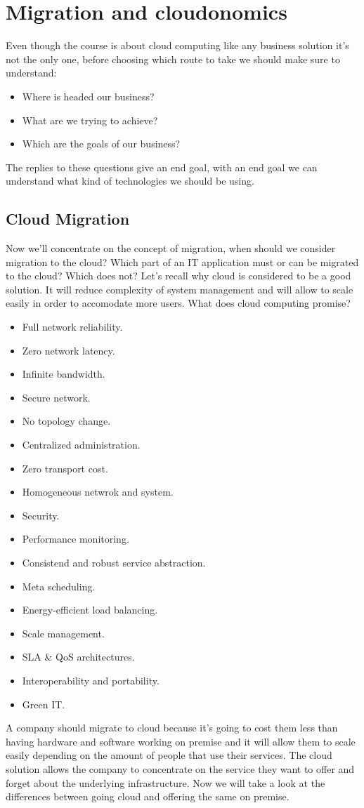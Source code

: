 \section{Migration and cloudonomics}
Even though the course is about cloud computing like any business solution it's not the only one, before choosing which route to take we should make sure to understand:
\begin{itemize}
    \item Where is headed our business?
    \item What are we trying to achieve?
    \item Which are the goals of our business?
\end{itemize}
The replies to these questions give an end goal, with an end goal we can understand what kind of technologies we should be using.
\subsection{Cloud Migration}
Now we'll concentrate on the concept of migration, when should we consider migration to the cloud? Which part of an IT application must or can be migrated to the cloud? Which does not? \n
Let's recall why cloud is considered to be a good solution. It will reduce complexity of system management and will allow to scale easily in order to accomodate more users. \n
What does cloud computing promise?
\begin{itemize}
    \item Full network reliability.
    \item Zero network latency.
    \item Infinite bandwidth.
    \item Secure network.
    \item No topology change.
    \item Centralized administration.
    \item Zero transport cost.
    \item Homogeneous netwrok and system.
    \item Security.
    \item Performance monitoring.
    \item Consistend and robust service abstraction.
    \item Meta scheduling.
    \item Energy-efficient load balancing.
    \item Scale management.
    \item SLA \& QoS architectures.
    \item Interoperability and portability.
    \item Green IT.
\end{itemize}
A company should migrate to cloud because it's going to cost them less than having hardware and software working on premise and it will allow them to scale easily depending on the amount of people that use their services. \n 
The cloud solution allows the company to concentrate on the service they want to offer and forget about the underlying infrastructure. Now we will take a look at the differences between going cloud and offering the same on premise.
